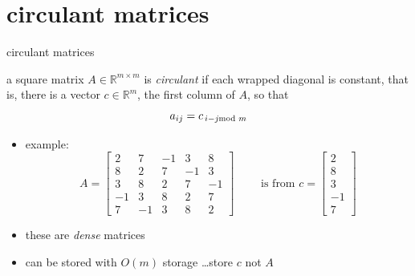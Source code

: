 \documentclass[10pt,
               svgnames,
               hyperref={colorlinks,citecolor=DeepPink4,linkcolor=FireBrick,urlcolor=Maroon},
               usepdftitle=false]{beamer}
\newcommand{\RR}{\mathbb{R}}
\begin{document}
\section{circulant matrices}

\begin{frame}{circulant matrices}

\begin{definition}
a square matrix $A \in \RR^{m\times m}$ is \emph{circulant} if each wrapped diagonal is constant, that is, there is a vector $c \in \RR^m$, the first column of $A$, so that
	$$a_{ij} = c_{\,i - j \hspace{-2mm} \mod m}$$
\end{definition}

\begin{itemize}
\item example:
	$$A = \begin{bmatrix} 2 & 7 & -1 & 3 & 8 \\ 8 & 2 & 7 & -1 & 3 \\ 3 & 8 & 2 & 7 & -1 \\ -1 & 3 & 8 & 2 & 7 \\ 7 & -1 & 3 & 8 & 2 \end{bmatrix} \qquad \text{ is from } c = \begin{bmatrix} 2 \\ 8 \\ 3 \\ -1 \\ 7 \end{bmatrix}$$
\item these are \emph{dense} matrices
\item can be stored with $O(m)$ storage \dots store $c$ not $A$
\end{itemize}
\end{frame}
\end{document}
